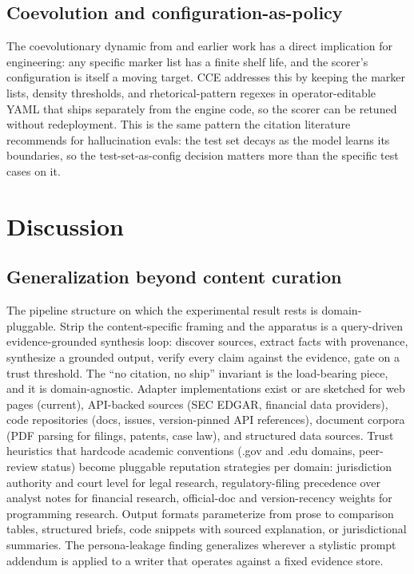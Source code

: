 \documentclass[11pt]{article}
\begin{document}
\subsection{Coevolution and configuration-as-policy}

The coevolutionary dynamic from \citet{qiu_rhetorical_2025} and earlier
work has a direct implication for engineering: any specific marker list
has a finite shelf life, and the scorer's configuration is itself a
moving target. CCE addresses this by keeping the marker lists, density
thresholds, and rhetorical-pattern regexes in operator-editable YAML
that ships separately from the engine code, so the scorer can be
retuned without redeployment. This is the same pattern the citation
literature recommends for hallucination evals: the test set decays as
the model learns its boundaries, so the test-set-as-config decision
matters more than the specific test cases on it.

\section{Discussion}
\label{sec:discussion}

\subsection{Generalization beyond content curation}

The pipeline structure on which the experimental result rests is
domain-pluggable. Strip the content-specific framing and the apparatus
is a query-driven evidence-grounded synthesis loop: discover sources,
extract facts with provenance, synthesize a grounded output, verify
every claim against the evidence, gate on a trust threshold. The
``no citation, no ship'' invariant is the load-bearing piece, and it
is domain-agnostic. Adapter implementations exist or are sketched for
web pages (current), API-backed sources (SEC EDGAR, financial data
providers), code repositories (docs, issues, version-pinned API
references), document corpora (PDF parsing for filings, patents, case
law), and structured data sources. Trust heuristics that hardcode
academic conventions (.gov and .edu domains, peer-review status) become
pluggable reputation strategies per domain: jurisdiction authority and
court level for legal research, regulatory-filing precedence over
analyst notes for financial research, official-doc and version-recency
weights for programming research. Output formats parameterize from
prose to comparison tables, structured briefs, code snippets with
sourced explanation, or jurisdictional summaries. The persona-leakage
finding generalizes wherever a stylistic prompt addendum is applied to
a writer that operates against a fixed evidence store.
\end{document}
